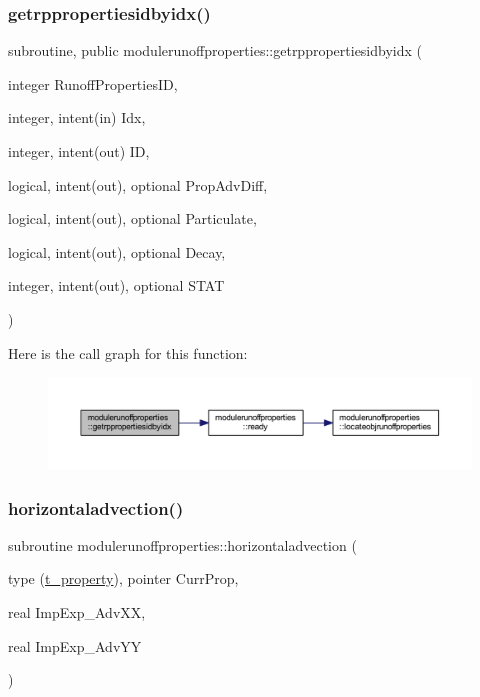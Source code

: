 \subsubsection{\texorpdfstring{getrppropertiesidbyidx()}{getrppropertiesidbyidx()}}
{\footnotesize\ttfamily subroutine, public modulerunoffproperties\+::getrppropertiesidbyidx (\begin{DoxyParamCaption}\item[{integer}]{Runoff\+Properties\+ID,  }\item[{integer, intent(in)}]{Idx,  }\item[{integer, intent(out)}]{ID,  }\item[{logical, intent(out), optional}]{Prop\+Adv\+Diff,  }\item[{logical, intent(out), optional}]{Particulate,  }\item[{logical, intent(out), optional}]{Decay,  }\item[{integer, intent(out), optional}]{S\+T\+AT }\end{DoxyParamCaption})}

Here is the call graph for this function\+:\nopagebreak
\begin{figure}[H]
\begin{center}
\leavevmode
\includegraphics[width=350pt]{namespacemodulerunoffproperties_a99e35b0a7f1f65083cde0db46427a9df_cgraph}
\end{center}
\end{figure}
\mbox{\label{namespacemodulerunoffproperties_a88919c7edf33d9d985c9378f1d5a24f9}} 
\subsubsection{\texorpdfstring{horizontaladvection()}{horizontaladvection()}}
{\footnotesize\ttfamily subroutine modulerunoffproperties\+::horizontaladvection (\begin{DoxyParamCaption}\item[{type (\mbox{\hyperlink{structmodulerunoffproperties_1_1t__property}{t\+\_\+property}}), pointer}]{Curr\+Prop,  }\item[{real}]{Imp\+Exp\+\_\+\+Adv\+XX,  }\item[{real}]{Imp\+Exp\+\_\+\+Adv\+YY }\end{DoxyParamCaption})\hspace{0.3cm}{\ttfamily [private]}}

